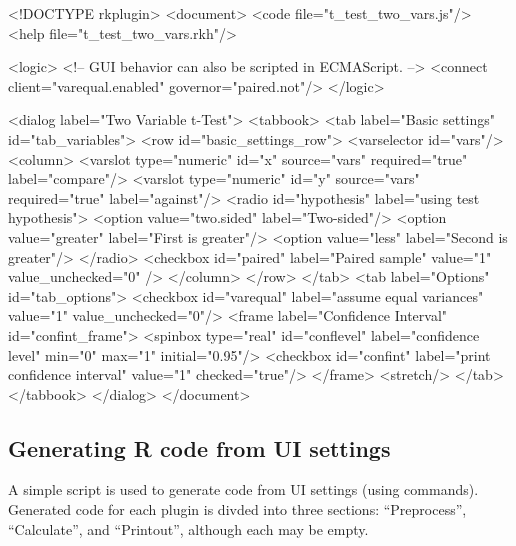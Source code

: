 \begin{footnotesize}
\begin{Code}
<!DOCTYPE rkplugin>
<document>
  <code file="t_test_two_vars.js"/>
  <help file="t_test_two_vars.rkh"/>

  <logic>
    <!-- GUI behavior can also be scripted in ECMAScript. -->
    <connect client="varequal.enabled" governor="paired.not"/>
  </logic>

  <dialog label="Two Variable t-Test">
    <tabbook>
      <tab label="Basic settings" id="tab_variables">
        <row id="basic_settings_row">
          <varselector id="vars"/>
          <column>
            <varslot type="numeric" id="x" source="vars" required="true"
              label="compare"/>                                                             
            <varslot type="numeric" id="y" source="vars" required="true"
              label="against"/>
            <radio id="hypothesis" label="using test hypothesis">
              <option value="two.sided" label="Two-sided"/>
              <option value="greater" label="First is greater"/>
              <option value="less" label="Second is greater"/>
            </radio>
            <checkbox id="paired" label="Paired sample" value="1" value_unchecked="0" />
          </column>
        </row>
      </tab>
      <tab label="Options" id="tab_options">
        <checkbox id="varequal" label="assume equal variances" value="1"
          value_unchecked="0"/>
        <frame label="Confidence Interval" id="confint_frame">
          <spinbox type="real" id="conflevel" label="confidence level" min="0" max="1"
            initial="0.95"/>
          <checkbox id="confint" label="print confidence interval" value="1"
            checked="true"/>
        </frame>
        <stretch/>
      </tab>
    </tabbook>
  </dialog>
</document>
\end{Code}
\end{footnotesize}

\subsection{Generating R code from UI settings}
\label{sec:generating_r_code_from_ui_settings}
A simple  script is used to generate  code from UI settings (using  commands).
Generated code for each plugin is divded into three sections: ``Preprocess'', ``Calculate'', and ``Printout'', although each
may be empty.

